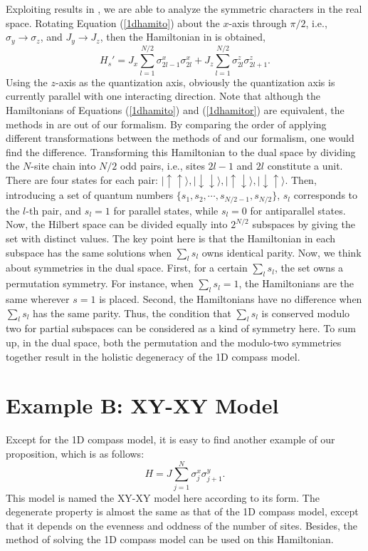 \documentclass[twocolumn,floats,superscriptaddress]{revtex4}
\begin{document}
 {Exploiting results in \cite{Brzezicki2007}, we are able to analyze the symmetric characters in the real space.} Rotating Equation (\ref{1dhamito}) about the $x$-axis through $\pi/2$, i.e., $\sigma_y\rightarrow \sigma_z$, and $J_y\rightarrow J_z$, then the Hamiltonian in \cite{Brzezicki2007} is obtained,
\begin{equation}\label{1dhamitor}
H_s'=J_x\sum_{l=1}^{N/2}{\sigma^x_{2l-1}\sigma^x_{2l}}+J_z\sum_{l=1}^{N/2}{\sigma^z_{2l}\sigma^z_{2l+1}}.
\end{equation}
Using the $z$-axis as the quantization axis, obviously the quantization axis is currently parallel with one interacting direction. Note that although the Hamiltonians of Equations (\ref{1dhamito}) and (\ref{1dhamitor}) are {equivalent, the methods} in \cite{Brzezicki2007} are out of our formalism. {By comparing the order of applying different transformations between the methods {of} \cite{Brzezicki2007} and our formalism, one would find the difference.} Transforming this Hamiltonian to the dual space by dividing the $N$-site chain into $N/2$ odd pairs, i.e., sites $2l-1$ and $2l$ constitute a unit. There are four states for each pair: $|\uparrow\uparrow \rangle, |\downarrow\downarrow\rangle, |\uparrow\downarrow\rangle, |\downarrow\uparrow\rangle$. Then, introducing a set of quantum numbers $\{s_1,s_2, \cdots, s_{N/2-1},s_{N/2}\}$, $s_l$ corresponds to the $l$-th pair, and $s_l=1$ for parallel states, while $s_l=0$ for antiparallel states. Now, the Hilbert space can be divided equally into $2^{N/2}$ subspaces by giving the set with {distinct} values.
 {The key} point here is that the Hamiltonian in each subspace has the same {solutions} when $\sum_l s_l$ {owns} identical parity.
Now, we {think about} symmetries in the dual space. First, for a certain $\sum_l s_l$, the set owns a permutation symmetry. For instance, when $\sum_l s_l=1$, the Hamiltonians are the same {wherever} $s=1$ is placed. Second, the Hamiltonians have no difference when $\sum_l s_l$ has the same parity. {Thus, the condition that $\sum_l s_l$ is conserved modulo two for partial subspaces can be considered as a kind of symmetry here.} {To sum up, in the dual space, both the permutation and the modulo-two symmetries together result in the holistic degeneracy of the 1D compass model.}

\section{ {Example B: XY-XY Model}}\label{exb}
Except for the 1D compass model, it is easy to find another example of our {proposition}, which is as follows:
\begin{equation}\label{hexb}
H=J\sum_{j=1}^{N} \sigma_j^x\sigma_{j+1}^y.
\end{equation}
This model is {named} the {XY-XY model} here according to its form. {The degenerate property is} almost the same as that of the 1D compass model, except that it depends on the evenness and oddness of the number of sites. {Besides, the method of solving the 1D compass model can be used on this Hamiltonian.}
\end{document}

